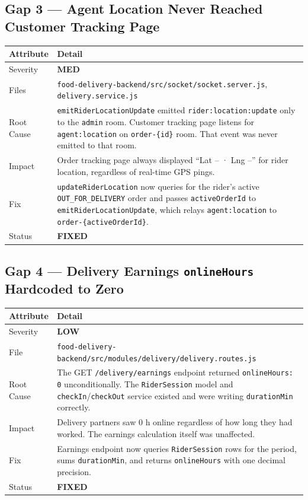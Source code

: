 \documentclass[11pt,a4paper]{article}
\newcommand{\FIXED}{\colorbox{successgreen!20}{\color{successgreen}\bfseries\small FIXED}}
\newcommand{\MEDIUM}{\colorbox{warnyellow!18}{\color{warnyellow}\bfseries\tiny MED}}
\newcommand{\LOW}{\colorbox{successgreen!18}{\color{successgreen}\bfseries\tiny LOW}}
\begin{document}
\subsection{Gap 3 — Agent Location Never Reached Customer Tracking Page}

\begin{tabularx}{\textwidth}{@{}lX@{}}
\toprule
\rowcolor{navyblue}\color{white}\bfseries Attribute & \color{white}\bfseries Detail \\
\midrule
Severity    & \MEDIUM \\
\rowcolor{rowalt}
Files       & \texttt{food-delivery-backend/src/socket/socket.server.js}, \texttt{delivery.service.js} \\
Root Cause  & \texttt{emitRiderLocationUpdate} emitted \texttt{rider:location:update} only to the \texttt{admin} room. Customer tracking page listens for \texttt{agent:location} on \texttt{order-\{id\}} room. That event was never emitted to that room. \\
\rowcolor{rowalt}
Impact      & Order tracking page always displayed ``Lat -- · Lng --'' for rider location, regardless of real-time GPS pings. \\
Fix         & \texttt{updateRiderLocation} now queries for the rider's active \texttt{OUT\_FOR\_DELIVERY} order and passes \texttt{activeOrderId} to \texttt{emitRiderLocationUpdate}, which relays \texttt{agent:location} to \texttt{order-\{activeOrderId\}}. \\
\rowcolor{rowalt}
Status      & \FIXED \\
\bottomrule
\end{tabularx}

\subsection{Gap 4 — Delivery Earnings \texttt{onlineHours} Hardcoded to Zero}

\begin{tabularx}{\textwidth}{@{}lX@{}}
\toprule
\rowcolor{navyblue}\color{white}\bfseries Attribute & \color{white}\bfseries Detail \\
\midrule
Severity    & \LOW \\
\rowcolor{rowalt}
File        & \texttt{food-delivery-backend/src/modules/delivery/delivery.routes.js} \\
Root Cause  & The GET \texttt{/delivery/earnings} endpoint returned \texttt{onlineHours: 0} unconditionally. The \texttt{RiderSession} model and \texttt{checkIn}/\texttt{checkOut} service existed and were writing \texttt{durationMin} correctly. \\
\rowcolor{rowalt}
Impact      & Delivery partners saw 0 h online regardless of how long they had worked. The earnings calculation itself was unaffected. \\
Fix         & Earnings endpoint now queries \texttt{RiderSession} rows for the period, sums \texttt{durationMin}, and returns \texttt{onlineHours} with one decimal precision. \\
\rowcolor{rowalt}
Status      & \FIXED \\
\bottomrule
\end{tabularx}
\end{document}
